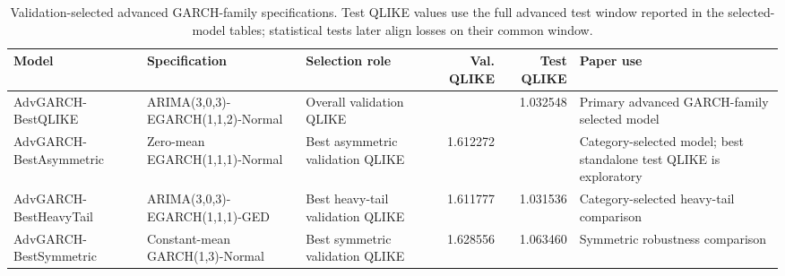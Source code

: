 \begin{table}[!t]
\centering
\caption{Validation-selected advanced GARCH-family specifications. Test QLIKE values use the full advanced test window reported in the selected-model tables; statistical tests later align losses on their common window.}
\label{tab:advanced-garch}
\scriptsize
\setlength{\tabcolsep}{3pt}
\begin{tabular}{@{}L{0.18\textwidth}L{0.20\textwidth}L{0.16\textwidth}r r L{0.20\textwidth}@{}}
\toprule
Model & Specification & Selection role & Val. QLIKE & Test QLIKE & Paper use \\
\midrule
AdvGARCH-BestQLIKE & ARIMA(3,0,3)-EGARCH(1,1,2)-Normal & Overall validation QLIKE &  & 1.032548 & Primary advanced GARCH-family selected model \\
AdvGARCH-BestAsymmetric & Zero-mean EGARCH(1,1,1)-Normal & Best asymmetric validation QLIKE & 1.612272 &  & Category-selected model; best standalone test QLIKE is exploratory \\
AdvGARCH-BestHeavyTail & ARIMA(3,0,3)-EGARCH(1,1,1)-GED & Best heavy-tail validation QLIKE & 1.611777 & 1.031536 & Category-selected heavy-tail comparison \\
AdvGARCH-BestSymmetric & Constant-mean GARCH(1,3)-Normal & Best symmetric validation QLIKE & 1.628556 & 1.063460 & Symmetric robustness comparison \\
\bottomrule
\end{tabular}
\end{table}
